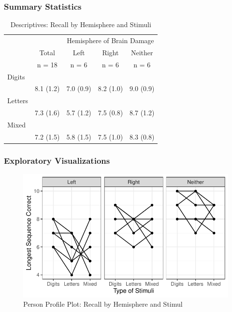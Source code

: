 \documentclass[
]{article}
\begin{document}
\hypertarget{summary-statistics-2}{%
\subsubsection{Summary Statistics}\label{summary-statistics-2}}

\begin{table}[ ht ] 
\centering 
\caption{Descriptives: Recall by Hemisphere and Stimuli}\label{}
\begin{tabular}{ l c c c c }
\toprule
 &   &  \multicolumn{ 3 }{c}{ Hemisphere of Brain Damage }\\ 
  & Total & Left & Right & Neither \\ 
 & n = 18 & n = 6 & n = 6 & n = 6 \\ 
 \midrule
Digits &   &   &   &  \\ 
\hspace{6pt}   & 8.1 (1.2) & 7.0 (0.9) & 8.2 (1.0) & 9.0 (0.9)\\ 
Letters &   &   &   &  \\ 
\hspace{6pt}   & 7.3 (1.6) & 5.7 (1.2) & 7.5 (0.8) & 8.7 (1.2)\\ 
Mixed &   &   &   &  \\ 
\hspace{6pt}   & 7.2 (1.5) & 5.8 (1.5) & 7.5 (1.0) & 8.3 (0.8)\\ 
\bottomrule

\end{tabular}
\end{table}

\clearpage

\hypertarget{exploratory-visualizations-1}{%
\subsubsection{Exploratory
Visualizations}\label{exploratory-visualizations-1}}

\begin{figure}

{\centering \includegraphics{Chapter-16-Assignment-R-Skeleton_files/figure-latex/unnamed-chunk-23-1} 

}

\caption{Person Profile Plot: Recall by Hemisphere and Stimul}\label{fig:unnamed-chunk-23}
\end{figure}
\end{document}

